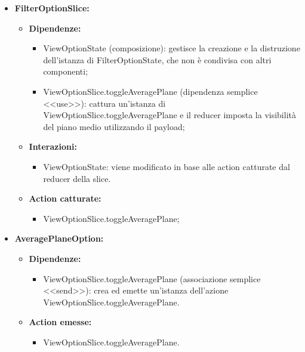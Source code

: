 \begin{itemize}
    \item \textbf{FilterOptionSlice:}
          \begin{itemize}
              \item \textbf{Dipendenze:}
                    \begin{itemize}
                        \item ViewOptionState (composizione): gestisce la creazione e la distruzione
                              dell'istanza di FilterOptionState, che non è condivisa con altri componenti;
                        \item ViewOptionSlice.toggleAveragePlane (dipendenza semplice <<use>>): cattura
                              un'istanza di ViewOptionSlice.toggleAveragePlane e il reducer imposta la
                              visibilità del piano medio utilizzando il payload;
                    \end{itemize}
              \item \textbf{Interazioni:}
                    \begin{itemize}
                        \item ViewOptionState: viene modificato in base alle action catturate dal reducer
                              della slice.
                    \end{itemize}
              \item \textbf{Action catturate:}
                    \begin{itemize}
                        \item ViewOptionSlice.toggleAveragePlane;
                    \end{itemize}
          \end{itemize}

    \item \textbf{AveragePlaneOption:}
          \begin{itemize}
              \item \textbf{Dipendenze:}
                    \begin{itemize}
                        \item ViewOptionSlice.toggleAveragePlane (associazione semplice <<send>>): crea ed
                              emette un'istanza dell'azione ViewOptionSlice.toggleAveragePlane.
                    \end{itemize}
              \item \textbf{Action emesse:}
                    \begin{itemize}
                        \item ViewOptionSlice.toggleAveragePlane.
                    \end{itemize}
          \end{itemize}


\end{itemize}
